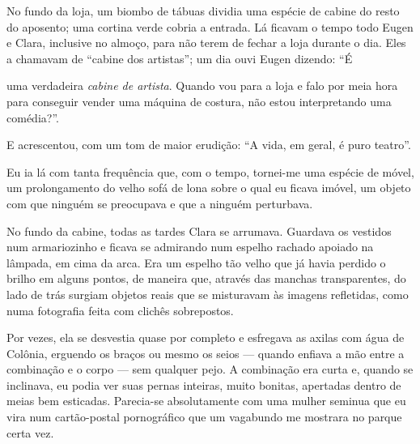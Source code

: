 No fundo da loja, um biombo de tábuas dividia uma espécie de cabine do resto
do aposento; uma cortina verde cobria a entrada. Lá ficavam o tempo todo
Eugen e Clara, inclusive no almoço, para não terem de fechar a loja durante o
dia. Eles a chamavam de ``cabine dos artistas''; um dia ouvi Eugen dizendo:
``É\linebreak

\pagebreak

\noindent{}uma verdadeira \textit{cabine de artista}. Quando vou para a loja e falo
por meia hora para conseguir vender uma máquina de costura, não estou
interpretando uma comédia?''.

E acrescentou, com um tom de maior erudição: ``A vida, em geral, é puro
teatro''.


Eu ia lá com tanta frequência que, com o tempo, tornei-me uma espécie de
móvel, um prolongamento do velho sofá de lona sobre o qual eu ficava imóvel,
um objeto com que ninguém se preocupava e que a ninguém perturbava.

No fundo da cabine, todas as tardes Clara se arrumava. Guardava os vestidos
num armariozinho e ficava se admirando num espelho rachado apoiado na
lâmpada, em cima da arca. Era um espelho tão velho que já havia perdido o
brilho em alguns pontos, de maneira que, através das manchas transparentes,
do lado de trás surgiam objetos reais que se misturavam às imagens
refletidas, como numa fotografia feita com clichês sobrepostos.

Por vezes, ela se desvestia quase por completo e esfregava as axilas com água
de Colônia, erguendo os braços ou mesmo os seios --- quando enfiava a mão
entre a combinação e o corpo --- sem qualquer pejo. A combinação era curta e,
quando se inclinava, eu podia ver suas pernas inteiras, muito bonitas,
apertadas dentro de meias bem esticadas. Parecia-se absolutamente com uma
mulher seminua que eu vira num cartão-postal pornográfico que um vagabundo me
mostrara no parque certa vez.

